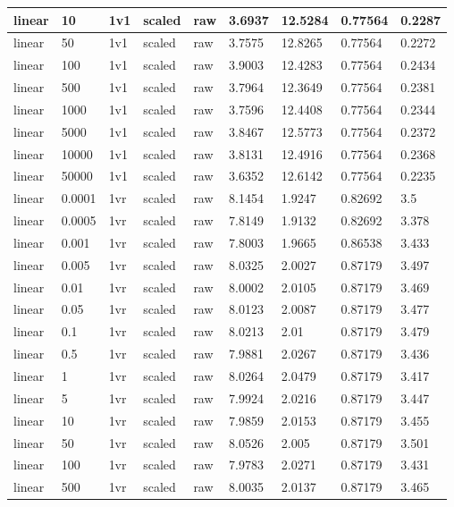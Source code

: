 \begin{longtable}{lllllllll}
linear & 10 & 1v1 & scaled & raw & 3.6937 & 12.5284 & 0.77564 & 0.2287\\ \hline
linear & 50 & 1v1 & scaled & raw & 3.7575 & 12.8265 & 0.77564 & 0.2272\\ \hline
linear & 100 & 1v1 & scaled & raw & 3.9003 & 12.4283 & 0.77564 & 0.2434\\ \hline
linear & 500 & 1v1 & scaled & raw & 3.7964 & 12.3649 & 0.77564 & 0.2381\\ \hline
linear & 1000 & 1v1 & scaled & raw & 3.7596 & 12.4408 & 0.77564 & 0.2344\\ \hline
linear & 5000 & 1v1 & scaled & raw & 3.8467 & 12.5773 & 0.77564 & 0.2372\\ \hline
linear & 10000 & 1v1 & scaled & raw & 3.8131 & 12.4916 & 0.77564 & 0.2368\\ \hline
linear & 50000 & 1v1 & scaled & raw & 3.6352 & 12.6142 & 0.77564 & 0.2235\\ \hline
linear & 0.0001 & 1vr & scaled & raw & 8.1454 & 1.9247 & 0.82692 & 3.5\\ \hline
linear & 0.0005 & 1vr & scaled & raw & 7.8149 & 1.9132 & 0.82692 & 3.378\\ \hline
linear & 0.001 & 1vr & scaled & raw & 7.8003 & 1.9665 & 0.86538 & 3.433\\ \hline
linear & 0.005 & 1vr & scaled & raw & 8.0325 & 2.0027 & 0.87179 & 3.497\\ \hline
linear & 0.01 & 1vr & scaled & raw & 8.0002 & 2.0105 & 0.87179 & 3.469\\ \hline
linear & 0.05 & 1vr & scaled & raw & 8.0123 & 2.0087 & 0.87179 & 3.477\\ \hline
linear & 0.1 & 1vr & scaled & raw & 8.0213 & 2.01 & 0.87179 & 3.479\\ \hline
linear & 0.5 & 1vr & scaled & raw & 7.9881 & 2.0267 & 0.87179 & 3.436\\ \hline
linear & 1 & 1vr & scaled & raw & 8.0264 & 2.0479 & 0.87179 & 3.417\\ \hline
linear & 5 & 1vr & scaled & raw & 7.9924 & 2.0216 & 0.87179 & 3.447\\ \hline
linear & 10 & 1vr & scaled & raw & 7.9859 & 2.0153 & 0.87179 & 3.455\\ \hline
linear & 50 & 1vr & scaled & raw & 8.0526 & 2.005 & 0.87179 & 3.501\\ \hline
linear & 100 & 1vr & scaled & raw & 7.9783 & 2.0271 & 0.87179 & 3.431\\ \hline
linear & 500 & 1vr & scaled & raw & 8.0035 & 2.0137 & 0.87179 & 3.465\\ \hline

\end{longtable}
